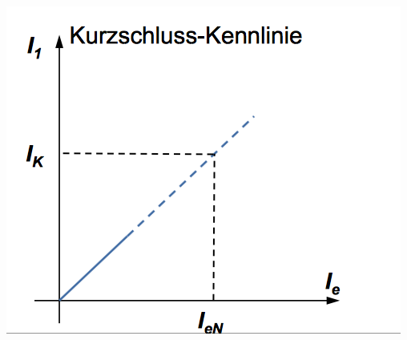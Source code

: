 \begin{minipage}{0.4 \linewidth}
\includegraphics[width = \linewidth]{./Pics/VL910/kurzschlussk}
\end{minipage}
